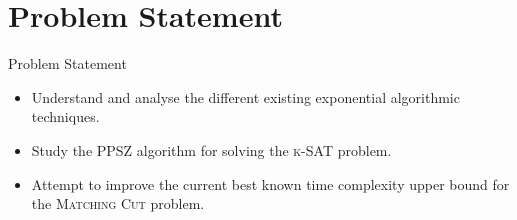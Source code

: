 \documentclass[
	xcolor={svgnames},
	hyperref={pagebackref,bookmarks},
	aspectratio=43,
]{beamer}
\title{\presentationtitle}
\subtitle{{- Under Dr. N.R. Aravind}}
\author{\presenter}
\institute[IITH]{
	\university\\
}
\date{\today}
\begin{document}
\newcommand{\brak}[1]{\ensuremath{\left( #1 \right)}}
\newcommand{\sbrak}[1]{\ensuremath{\left[ #1 \right]}}
\newcommand{\Exp}[1]{\ensuremath{\mathbb{E} \left[ #1 \right]}}
\newcommand{\Var}[1]{\ensuremath{\text{Var} \left[ #1 \right]}}
\newcommand{\uar}{\stackrel{\$}{\leftarrow}}


\begin{frame}
	\titlepage
\end{frame}



\section{Problem Statement}
\begin{frame}{Problem Statement}
	\begin{itemize}
		\item<1-> Understand and analyse the different existing exponential algorithmic techniques. %
		\item<2-> Study the PPSZ algorithm for solving the \textsc{k-SAT} problem.
		\item<3-> Attempt to improve the current best known time complexity upper bound for the \textsc{Matching Cut} problem.
	\end{itemize}
\end{frame}
\end{document}

